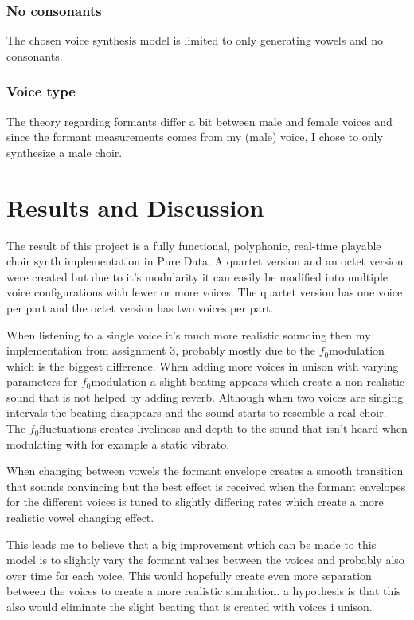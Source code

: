 \documentclass{article}
\newcommand{\fo}{$f_0$}
\begin{document}
\subsubsection{No consonants}
The chosen voice synthesis model is limited to only generating vowels and no consonants.

\subsubsection{Voice type}
The theory regarding formants differ a bit between male and female voices and since the formant measurements comes from my (male) voice, I chose to only synthesize a male choir.

\section{Results and Discussion}\label{sec:results-discussion}
The result of this project is a fully functional, polyphonic, real-time playable choir synth implementation in Pure Data. A quartet version and an octet version were created but due to it's modularity it can easily be modified into multiple voice configurations with fewer or more voices. The quartet version has one voice per part and the octet version has two voices per part.

When listening to a single voice it's much more realistic sounding then my implementation from assignment 3, probably mostly due to the \fo  modulation which is the biggest difference. When adding more voices in unison with varying parameters for \fo  modulation a slight beating appears which create a non realistic sound that is not helped by adding reverb. Although when two voices are singing intervals the beating disappears and the sound starts to resemble a real choir. The \fo  fluctuations creates liveliness and depth to the sound that isn't heard when modulating with for example a static vibrato.

When changing between vowels the formant envelope creates a smooth transition that sounds convincing but the best effect is received when the formant envelopes for the different voices is tuned to slightly differing rates which create a more realistic vowel changing effect.

This leads me to believe that a big improvement which can be made to this model is to slightly vary the formant values between the voices and probably also over time for each voice. This would hopefully create even more separation between the voices to create a more realistic simulation. a hypothesis is that this also would eliminate the slight beating that is created with voices i unison.
\end{document}
